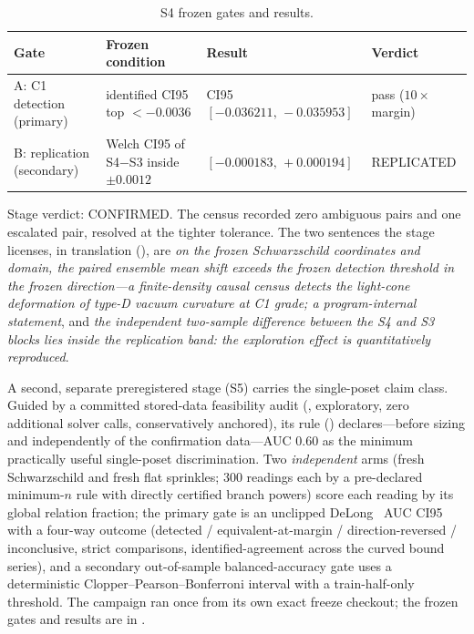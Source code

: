 \begin{table}[t]
\caption{S4 frozen gates and results.}
\label{tab:s4}
\centering
\footnotesize
\begin{tabular}{@{}>{\raggedright\arraybackslash}p{6.5pc}>{\raggedright\arraybackslash}p{10pc}>{\raggedright\arraybackslash}p{11pc}>{\raggedright\arraybackslash}p{5.5pc}@{}}
\toprule
Gate & Frozen condition & Result & Verdict \\
\midrule
A: C1 detection (primary) & identified CI95 top $< -0.0036$ & CI95 $[-0.036211,\, -0.035953]$ & pass ($10\times$ margin) \\
B: replication (secondary) & Welch CI95 of S4$-$S3 inside $\pm 0.0012$ & $[-0.000183,\, +0.000194]$ & REPLICATED \\
\bottomrule
\end{tabular}
\end{table}

Stage verdict: CONFIRMED. The census recorded zero ambiguous pairs and one
escalated pair, resolved at the tighter tolerance. The two sentences the
stage licenses, in translation
(), are
\textit{on the frozen Schwarzschild coordinates and domain, the paired
ensemble mean shift exceeds the frozen detection threshold in the frozen
direction---a finite-density causal census detects the light-cone
deformation of type-D vacuum curvature at C1 grade; a program-internal
statement}, and
\textit{the independent two-sample difference between the S4 and S3 blocks
lies inside the replication band: the exploration effect is quantitatively
reproduced}.

A second, separate preregistered stage (S5) carries the single-poset claim
class. Guided by a committed stored-data feasibility audit
(, exploratory, zero
additional solver calls, conservatively anchored), its rule
() declares---before
sizing and independently of the confirmation data---AUC 0.60 as the minimum
practically useful single-poset discrimination. Two \emph{independent} arms
(fresh Schwarzschild and fresh flat sprinkles; 300 readings each by a
pre-declared minimum-$n$ rule with directly certified branch powers) score
each reading by its global relation fraction; the primary gate is an
unclipped DeLong~\cite{delong1988} AUC CI95 with a four-way outcome (detected /
equivalent-at-margin / direction-reversed / inconclusive, strict
comparisons, identified-agreement across the curved bound series), and a
secondary out-of-sample balanced-accuracy gate uses a deterministic
Clopper--Pearson--Bonferroni interval with a train-half-only threshold. The
campaign ran once from its own exact freeze checkout; the frozen gates and
results are in .

